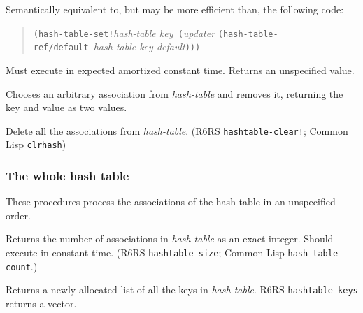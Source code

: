 \begin{entry}{%
  }

  Semantically equivalent to, but may be more efficient than, the
  following code:

\begin{quote}
  \texttt{(hash-table-set!}\emph{hash-table key}\texttt{\
    (}\emph{updater} \texttt{(hash-table-ref/default\
  }\emph{hash-table key default}\texttt{)))}
\end{quote}

Must execute in expected amortized constant time. Returns an
unspecified value.
\end{entry}

\begin{entry}{%
  }

  Chooses an arbitrary association from \emph{hash-table} and removes
  it, returning the key and value as two values.
\end{entry}

\begin{entry}{%
  }

  Delete all the associations from \emph{hash-table}. (R6RS
  \texttt{hashtable-clear!}; Common Lisp \texttt{clrhash})
\end{entry}

\subsubsection{The whole hash table}\label{Thewholehashtable}

These procedures process the associations of the hash table in an
unspecified order.

\begin{entry}{%
  }

  Returns the number of associations in \emph{hash-table} as an exact
  integer. Should execute in constant time. (R6RS
  \texttt{hashtable-size}; Common Lisp \texttt{hash-table-count}.)
\end{entry}

\begin{entry}{%
  }

  Returns a newly allocated list of all the keys in \emph{hash-table}.
  R6RS \texttt{hashtable-keys} returns a vector.
\end{entry}


